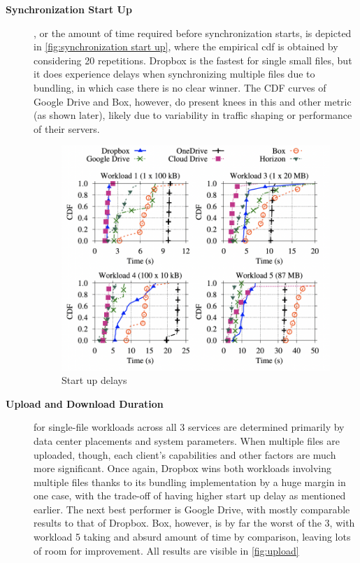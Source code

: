 \begin{description}
    \item[\textbf{Synchronization Start Up}], or the amount of time required before synchronization starts, is depicted in \autoref{fig:synchronization start up}, where the empirical \ac{cdf} is obtained by considering 20 repetitions. Dropbox is the fastest for single small files, but it does experience delays when synchronizing multiple files due to bundling, in which case there is no clear winner. The CDF curves of Google Drive and Box, however, do present knees in this and other metric (as shown later), likely due to variability in traffic shaping or performance of their servers.

    \begin{figure} [h]
        \centering
        \includegraphics[scale=0.7]{images/start_up_delay}
        \caption{\label{fig:synchronization start up}Start up delays}
    \end{figure}

    \item[\textbf{Upload and Download Duration}] for single-file workloads across all 3 services are determined primarily by data center placements and system parameters. When multiple files are uploaded, though, each client's capabilities and other factors are much more significant. Once again, Dropbox wins both workloads involving multiple files thanks to its bundling implementation by a huge margin in one case, with the trade-off of having higher start up delay as mentioned earlier. The next best performer is Google Drive, with mostly comparable results to that of Dropbox. Box, however, is by far the worst of the 3, with workload 5 taking and absurd amount of time by comparison, leaving lots of room for improvement. All results are visible in \autoref{fig:upload}


\end{description}
